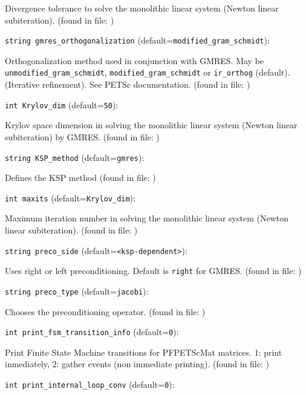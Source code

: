 Divergence tolerance to solve the monolithic linear
system (Newton linear subiteration).
 (found in file: \verb++)
\item\verb+string gmres_orthogonalization+ {\rm(default=\verb|modified_gram_schmidt|)}:

Orthogonalization method used in conjunction with GMRES. 
May be  {\tt unmodified\_gram\_schmidt},
 \verb+modified_gram_schmidt+  or {\tt ir\_orthog} (default). (Iterative refinement).
See PETSc documentation. 
 (found in file: \verb++)
\item\verb+int Krylov_dim+ {\rm(default=\verb|50|)}:

Krylov space dimension in solving the monolithic linear
system (Newton linear subiteration) by GMRES.
 (found in file: \verb++)
\item\verb+string KSP_method+ {\rm(default=\verb|gmres|)}:

Defines the KSP method
 (found in file: \verb++)
\item\verb+int maxits+ {\rm(default=\verb|Krylov_dim|)}:

Maximum iteration number in solving the monolithic linear
system (Newton linear subiteration).
 (found in file: \verb++)
\item\verb+string preco_side+ {\rm(default=\verb|<ksp-dependent>|)}:

Uses right or left preconditioning. Default is  \verb+right+  for
GMRES. 
 (found in file: \verb++)
\item\verb+string preco_type+ {\rm(default=\verb|jacobi|)}:

Chooses the preconditioning operator. 
 (found in file: \verb++)
\item\verb+int print_fsm_transition_info+ {\rm(default=\verb|0|)}:

Print Finite State Machine transitions for PFPETScMat matrices.
1: print inmediately, 2: gather events (non immediate printing). 
 (found in file: \verb++)
\item\verb+int print_internal_loop_conv+ {\rm(default=\verb|0|)}:

